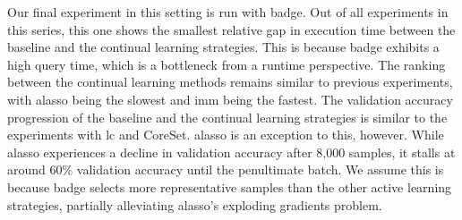 Our final experiment in this setting is run with \gls{badge}. Out of all experiments in this series, this one shows the smallest relative gap in execution time between the
baseline and the continual learning strategies. This is because \gls{badge} exhibits a high query time, which is a bottleneck from a runtime perspective. The ranking between
the continual learning methods remains similar to previous experiments, with \gls{alasso} being the slowest and \gls{imm} being the fastest.
The validation accuracy progression of the baseline and the continual learning strategies is similar to the experiments with \gls{lc} and CoreSet.
\gls{alasso} is an exception to this, however. While \gls{alasso} experiences a decline in validation accuracy after 8,000 samples, it stalls at around 60\% validation accuracy
until the penultimate batch. We assume this is because \gls{badge} selects more representative samples than the other active learning strategies, partially alleviating
\gls{alasso}'s exploding gradients problem. \par


